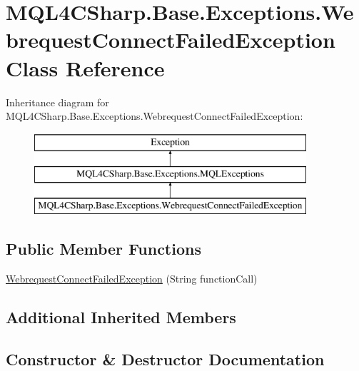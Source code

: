 \hypertarget{class_m_q_l4_c_sharp_1_1_base_1_1_exceptions_1_1_webrequest_connect_failed_exception}{}\section{M\+Q\+L4\+C\+Sharp.\+Base.\+Exceptions.\+Webrequest\+Connect\+Failed\+Exception Class Reference}
\label{class_m_q_l4_c_sharp_1_1_base_1_1_exceptions_1_1_webrequest_connect_failed_exception}
Inheritance diagram for M\+Q\+L4\+C\+Sharp.\+Base.\+Exceptions.\+Webrequest\+Connect\+Failed\+Exception\+:\begin{figure}[H]
\begin{center}
\leavevmode
\includegraphics[height=3.000000cm]{class_m_q_l4_c_sharp_1_1_base_1_1_exceptions_1_1_webrequest_connect_failed_exception}
\end{center}
\end{figure}
\subsection*{Public Member Functions}
\begin{DoxyCompactItemize}
\item 
\hyperlink{class_m_q_l4_c_sharp_1_1_base_1_1_exceptions_1_1_webrequest_connect_failed_exception_aebea770fdd4f5c62eb9be95f41a0bcc5}{Webrequest\+Connect\+Failed\+Exception} (String function\+Call)
\end{DoxyCompactItemize}
\subsection*{Additional Inherited Members}


\subsection{Constructor \& Destructor Documentation}
